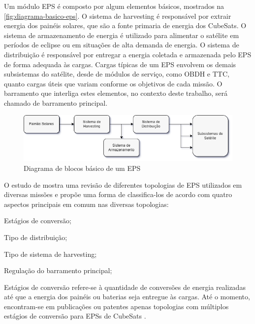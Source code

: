Um módulo \gls{EPS} é composto por algum elementos básicos, mostrados na \autoref{fig:diagrama-basico-eps}.
O sistema de harvesting é responsável por extrair energia dos painéis solares, que são a fonte primaria de energia dos CubeSats.
O sistema de armazenamento de energia é utilizado para alimentar o satélite em períodos de eclipse ou em situações de alta demanda de energia.
O sistema de distribuição é responsável por entregar a energia coletada e armazenada pelo \gls{EPS} de forma adequada às cargas.
Cargas típicas de um \gls{EPS} envolvem os demais subsistemas do satélite, desde de módulos de serviço, como \gls{OBDH} e \gls{TTC}, quanto cargas úteis que variam conforme os objetivos de cada missão.
O barramento que interliga estes elementos, no contexto deste trabalho, será chamado de barramento principal.

\begin{figure}[htp]
    \caption{Diagrama de blocos básico de um \gls{EPS}}
    \begin{center}
        \includegraphics[width=\textwidth, keepaspectratio]{images/basic-eps-block-diagram.png}
    \end{center}
    \label{fig:diagrama-basico-eps}
\end{figure}


O estudo de \textcite{comprehensive-review-eps} mostra uma revisão de diferentes topologias de \gls{EPS} utilizados em diversas missões e propõe uma forma de classifica-los de acordo com quatro aspectos principais em comum nas diversas topologias:
\begin{alineas}
    \item Estágios de conversão;
    \item Tipo de distribuição; %
    \item Tipo de sistema de harvesting;%
    \item Regulação do barramento principal;%
\end{alineas}

Estágios de conversão refere-se à quantidade de conversões de energia realizadas até que a energia dos painéis ou baterias seja entregue às cargas. Até o momento, encontram-se em publicações ou patentes apenas topologias com múltiplos estágios de conversão para \gls{EPS}s de CubeSats \cite{comprehensive-review-eps}.

